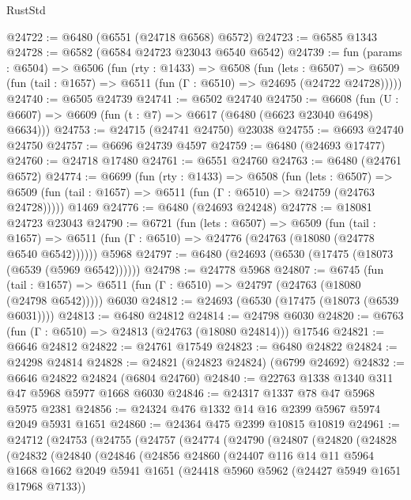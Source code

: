\begin{lexlean}{RustStd}
\begin{coremodule}
@24722 := @6480 (@6551 (@24718 @6568) @6572)
@24723 := @6585 @1343
@24728 := @6582 (@6584 @24723 @23043 @6540 @6542)
@24739 := fun (params : @6504) =>
  @6506
    (fun (rty : @1433) =>
    @6508
      (fun (lets : @6507) =>
      @6509 (fun (tail : @1657) => @6511 (fun (Γ : @6510) => @24695 (@24722 @24728)))))
@24740 := @6505 @24739
@24741 := @6502 @24740
@24750 := @6608
    (fun (U : @6607) => @6609 (fun (t : @7) => @6617 (@6480 (@6623 @23040 @6498) @6634)))
@24753 := @24715 (@24741 @24750) @23038
@24755 := @6693 @24740 @24750
@24757 := @6696 @24739 @4597
@24759 := @6480 (@24693 @17477)
@24760 := @24718 @17480
@24761 := @6551 @24760
@24763 := @6480 (@24761 @6572)
@24774 := @6699
    (fun (rty : @1433) =>
    @6508
      (fun (lets : @6507) =>
      @6509 (fun (tail : @1657) => @6511 (fun (Γ : @6510) => @24759 (@24763 @24728)))))
    @1469
@24776 := @6480 (@24693 @24248)
@24778 := @18081 @24723 @23043
@24790 := @6721
    (fun (lets : @6507) =>
    @6509
      (fun (tail : @1657) =>
      @6511 (fun (Γ : @6510) => @24776 (@24763 (@18080 (@24778 @6540 @6542))))))
    @5968
@24797 := @6480 (@24693 (@6530 (@17475 (@18073 (@6539 (@5969 @6542))))))
@24798 := @24778 @5968
@24807 := @6745
    (fun (tail : @1657) => @6511 (fun (Γ : @6510) => @24797 (@24763 (@18080 (@24798 @6542)))))
    @6030
@24812 := @24693 (@6530 (@17475 (@18073 (@6539 @6031))))
@24813 := @6480 @24812
@24814 := @24798 @6030
@24820 := @6763 (fun (Γ : @6510) => @24813 (@24763 (@18080 @24814))) @17546
@24821 := @6646 @24812
@24822 := @24761 @17549
@24823 := @6480 @24822
@24824 := @24298 @24814
@24828 := @24821 (@24823 @24824) (@6799 @24692)
@24832 := @6646 @24822 @24824 (@6804 @24760)
@24840 := @22763 @1338 @1340 @311 @47 @5968 @5977 @1668 @6030
@24846 := @24317 @1337 @78 @47 @5968 @5975 @2381
@24856 := @24324 @476 @1332 @14 @16 @2399 @5967 @5974 @2049 @5931 @1651
@24860 := @24364 @475 @2399 @10815 @10819
@24961 := @24712
    (@24753
      (@24755
        (@24757
          (@24774
            (@24790
              (@24807
                (@24820
                  (@24828
                    (@24832
                      (@24840
                        (@24846
                          (@24856
                            @24860
                            (@24407
                              @116
                              @14
                              @11
                              @5964
                              @1668
                              @1662
                              @2049
                              @5941
                              @1651
                              (@24418 @5960 @5962 (@24427 @5949 @1651 @17968 @7133))

\end{coremodule}
\end{lexlean}

